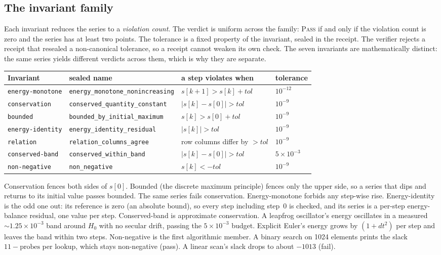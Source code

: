 \documentclass[11pt]{article}
\begin{document}
\subsection{The invariant family}

Each invariant reduces the series to a \emph{violation count}. The verdict is uniform across the family: \textsc{Pass} if and only if the violation count is zero and the series has at least two points. The tolerance is a fixed property of the invariant, sealed in the receipt. The verifier rejects a receipt that resealed a non-canonical tolerance, so a receipt cannot weaken its own check. The seven invariants are mathematically distinct: the same series yields different verdicts across them, which is why they are separate.

\begin{center}\small
\begin{tabular}{l l l l}
\toprule
Invariant & sealed name & a step violates when & tolerance \\
\midrule
\texttt{energy-monotone} & \texttt{energy\_monotone\_nonincreasing} & $s[k{+}1] > s[k] + \mathit{tol}$ & $10^{-12}$ \\
\texttt{conservation} & \texttt{conserved\_quantity\_constant} & $|s[k]-s[0]| > \mathit{tol}$ & $10^{-9}$ \\
\texttt{bounded} & \texttt{bounded\_by\_initial\_maximum} & $s[k] > s[0] + \mathit{tol}$ & $10^{-9}$ \\
\texttt{energy-identity} & \texttt{energy\_identity\_residual} & $|s[k]| > \mathit{tol}$ & $10^{-9}$ \\
\texttt{relation} & \texttt{relation\_columns\_agree} & row columns differ by $>\mathit{tol}$ & $10^{-9}$ \\
\texttt{conserved-band} & \texttt{conserved\_within\_band} & $|s[k]-s[0]| > \mathit{tol}$ & $5\!\times\!10^{-3}$ \\
\texttt{non-negative} & \texttt{non\_negative} & $s[k] < -\mathit{tol}$ & $10^{-9}$ \\
\bottomrule
\end{tabular}
\end{center}

\noindent Conservation fences both sides of $s[0]$. Bounded (the discrete maximum principle) fences only the upper side, so a series that dips and returns to its initial value passes bounded. The same series fails conservation. Energy-monotone forbids any step-wise rise. Energy-identity is the odd one out: its reference is zero (an absolute bound), so every step including step~0 is checked, and its series is a per-step energy-balance residual, one value per step. Conserved-band is approximate conservation. A leapfrog oscillator's energy oscillates in a measured $\sim\!1.25\!\times\!10^{-3}$ band around $H_0$ with no secular drift, passing the $5\!\times\!10^{-3}$ budget. Explicit Euler's energy grows by $(1{+}dt^2)$ per step and leaves the band within two steps. Non-negative is the first algorithmic member. A binary search on 1024 elements prints the slack $11 - \text{probes}$ per lookup, which stays non-negative (pass). A linear scan's slack drops to about $-1013$ (fail).
\end{document}
